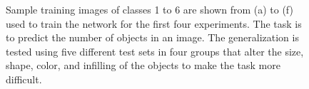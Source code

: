 \documentclass[letterpaper]{article} %
\begin{document}
\begin{figure}[!htbp] %
\centering
\hspace{0.5pt}
\hspace{0.5pt}
\hspace{0.5pt}
\hspace{0.5pt}
\hspace{0.5pt}
\caption{Sample training images of classes 1 to 6 are shown from (a) to (f) used to train the network for the first four experiments. The task is to predict the number of objects in an image. The generalization is tested using five different test sets in four groups that alter the size, shape, color, and infilling of the objects to make the task more difficult.}
\label{fig:train}
\end{figure}
\end{document}
